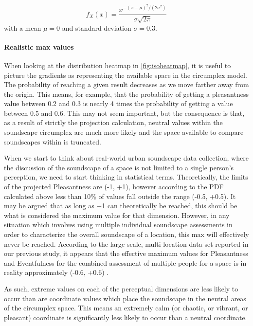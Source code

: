 \[   f_X(x) = \frac{x^{-(x-\mu)^2/(2\sigma^2)}}{\sigma \sqrt{2\pi}}\]
with a mean $\mu = 0$ and standard deviation $\sigma = 0.3$.

\paragraph*{Realistic max values}
When looking at the distribution heatmap in \autoref{fig:isoheatmap}, it is useful to picture the gradients as representing the available space in the circumplex model. The probability of reaching a given result decreases as we move farther away from the origin. This means, for example, that the probability of getting a pleasantness value between 0.2 and 0.3 is nearly 4 times the probability of getting a value between 0.5 and 0.6. This may not seem important, but the consequence is that, as a result of strictly the projection calculation, neutral values within the soundscape circumplex are much more likely and the space available to compare soundscapes within is truncated.

When we start to think about real-world urban soundscape data collection, where the discussion of the soundscape of a space is not limited to a single person's perception, we need to start thinking in statistical terms. Theoretically, the limits of the projected Pleasantness are (-1, +1), however according to the PDF calculated above less than 10\% of values fall outside the range (-0.5, +0.5).
It may be argued that as long as +1 can theoretically be reached, this should be what is considered the maximum value for that dimension. However, in any situation which involves using multiple individual soundscape assessments in order to characterize the overall soundscape of a location, this max will effectively never be reached. According to the large-scale, multi-location data set reported in our previous study, it appears that the effective maximum values for Pleasantness and Eventfulness for the combined assessment of multiple people for a space is in reality approximately (-0.6, +0.6) \citep{Lionello2021Introducing}.

As such, extreme values on each of the perceptual dimensions are less likely to occur than are coordinate values which place the soundscape in the neutral areas of the circumplex space. This means an extremely calm (or chaotic, or vibrant, or pleasant) coordinate is significantly less likely to occur than a neutral coordinate.



